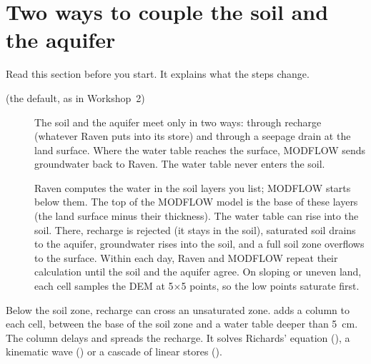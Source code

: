\section{Two ways to couple the soil and the aquifer}
Read this section before you start. It explains what the steps change.
\begin{description}
\item[ (the default, as in Workshop~2)] The soil and the aquifer meet only in two ways: through recharge
  (whatever Raven puts into its  store) and through a seepage drain at the land surface. Where the water
  table reaches the surface, MODFLOW sends groundwater back to Raven. The water table never enters the soil.
\item[] Raven computes the water in the soil layers you list; MODFLOW starts below them. The top of the
  MODFLOW model is the base of these layers (the land surface minus their thickness). The water table can rise into the soil. There, recharge is rejected (it stays in
  the soil), saturated soil drains to the aquifer, groundwater rises into the soil, and a full soil zone overflows to the
  surface. Within each day, Raven and MODFLOW repeat their calculation until the soil and the aquifer agree. On sloping or
  uneven land, each cell samples the DEM at 5$\times$5 points, so the low points saturate first.
\end{description}
Below the soil zone, recharge can cross an unsaturated zone.  adds a column to each cell, between the
base of the soil zone and a water table deeper than 5~cm. The column delays and spreads the recharge. It solves Richards'
equation (), a kinematic wave () or a cascade of linear stores ().

